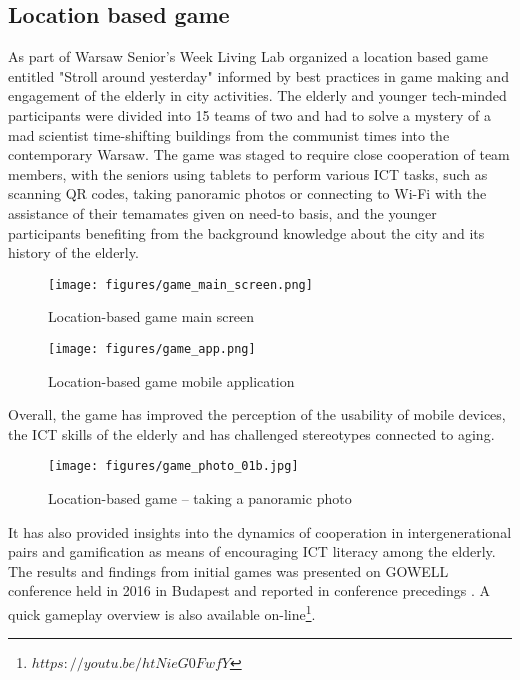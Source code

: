 \documentclass[sigconf]{acmart}
\begin{document}
\subsection{Location based game}

As part of Warsaw Senior's Week Living Lab organized a location based game entitled "Stroll around yesterday" informed by best practices in game making and engagement of the elderly in city activities. The elderly  and younger tech-minded participants were divided into 15 teams of two and had to solve a mystery of a mad scientist time-shifting buildings from the communist times into the contemporary Warsaw. The game was staged to require close cooperation of team members, with the seniors using tablets to perform various ICT tasks, such as scanning QR codes, taking panoramic photos or connecting to Wi-Fi  with the assistance of their temamates given on need-to basis, and the younger participants benefiting from the background knowledge about the city and its history of the elderly. 

\begin{figure}
\centering
\texttt{[image: figures/game\_main\_screen.png]}
\caption{Location-based game main screen}
\label{fig:game_main}
\end{figure}

\begin{figure}
\centering
\texttt{[image: figures/game\_app.png]}
\caption{Location-based game mobile application}
\label{fig:game_app}
\end{figure}


Overall, the game has improved the perception of the usability of mobile devices, the ICT skills of the elderly and has challenged stereotypes connected to aging.

\begin{figure}
\centering
\texttt{[image: figures/game\_photo\_01b.jpg]}
\caption{Location-based game -- taking a panoramic photo}
\label{fig:game_panoramic}
\end{figure}

It has also provided insights into the dynamics of cooperation in intergenerational pairs and gamification as means of encouraging ICT literacy among the elderly. The results and findings from initial games was presented on GOWELL conference held in 2016 in Budapest and reported in conference precedings \cite{kopec2017location} . A quick gameplay overview is also available on-line{\footnote{$https://youtu.be/htNieG0FwfY$}}.
\end{document}
